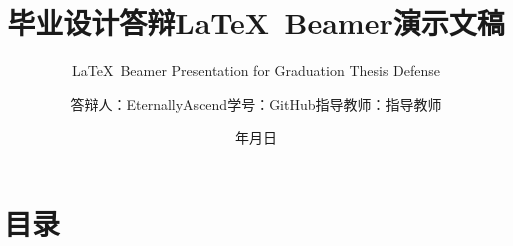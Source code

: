 \documentclass[UTF8]{ctexbeamer}
\begin{document}
\renewcommand{\today}{\number\year 年\number\month 月\number\day 日}
\renewcommand{\figurename}{图}
\renewcommand{\tablename}{表}
    \title{毕业设计答辩\LaTeX \, Beamer演示文稿} %
    \subtitle{\LaTeX \, Beamer Presentation for Graduation Thesis Defense} %
    \author[答辩人：EternallyAscend\ ]{答辩人：EternallyAscend\newline 学号：GitHub\newline 指导教师：指导教师} %
    \date{\today}  %

\begin{frame}
    \titlepage
\end{frame}

\section[目录]{目录}
\frame{
    \frametitle{\secname}
    \tableofcontents
}








% 
% 
\end{document}
